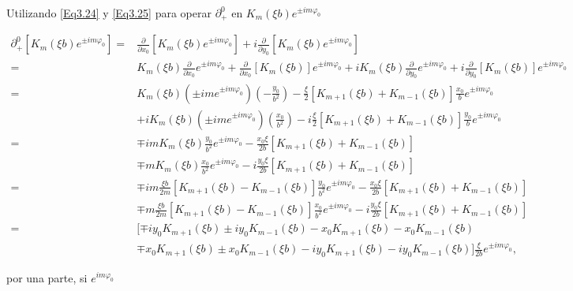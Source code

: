 \documentclass[a4paper,10pt]{article}
\newcommand{\parcial}[1]{\frac{\partial}{\partial {#1}}}	%
\begin{document}
Utilizando \eqref{Eq3.24} y \eqref{Eq3.25} para operar $\partial_+^0$ en $K_m(\xi b) e^{\pm im\varphi_0}$

\begin{subequations}
\begin{align}
\partial_+^0[K_m(\xi b) e^{\pm im\varphi_0}]
=&	\parcial{x_0}[K_m(\xi b)e^{\pm im\varphi_0}]+i\parcial{y_0}[K_m(\xi b)e^{\pm im\varphi_0}]	\\
=&	K_m(\xi b)\parcial{x_0}e^{\pm im\varphi_0}+\parcial{x_0}[K_m(\xi b)] e^{\pm im\varphi_0}+iK_m(\xi b)\parcial{y_0}e^{\pm im\varphi_0}+i\parcial{y_0}[K_m(\xi b)] e^{\pm im\varphi_0}	\\
=&	K_m(\xi b)(\pm im e^{\pm im\varphi_0})\left( -\frac{y_0}{b^2}\right)-\frac{\xi}{2}[K_{m+1}(\xi b)+K_{m-1}(\xi b)]\frac{x_0}{b}e^{\pm im\varphi_0}	\\
&+	iK_m(\xi b)(\pm im e^{\pm im\varphi_0})\left(\frac{x_0}{b^2}\right)-i\frac{\xi}{2}[K_{m+1}(\xi b)+K_{m-1}(\xi b)]\frac{y_0}{b}e^{\pm im\varphi_0}	\\
=&	\mp imK_m(\xi b)\frac{y_0}{b^2}e^{\pm im\varphi_0} -\frac{x_0\xi}{2b}[K_{m+1}(\xi b)+K_{m-1}(\xi b)]	\\
&	\mp mK_m(\xi b)\frac{x_0}{b^2}e^{\pm im\varphi_0} -i\frac{y_0\xi}{2b}[K_{m+1}(\xi b)+K_{m-1}(\xi b)]	\\
=&	\mp im\frac{\xi b}{2m}[K_{m+1}(\xi b)-K_{m-1}(\xi b)]\frac{y_0}{b^2}e^{\pm im\varphi_0} -\frac{x_0\xi}{2b}[K_{m+1}(\xi b)+K_{m-1}(\xi b)]	\\
&	\mp m\frac{\xi b}{2m}[K_{m+1}(\xi b)-K_{m-1}(\xi b)]\frac{x_0}{b^2}e^{\pm im\varphi_0} -i\frac{y_0\xi}{2b}[K_{m+1}(\xi b)+K_{m-1}(\xi b)]	\\
=&[\mp iy_0K_{m+1}(\xi b) \pm iy_0K_{m-1}(\xi b) -x_0K_{m+1}(\xi b)-x_0K_{m-1}(\xi b)	\\
&\mp x_0K_{m+1}(\xi b) \pm x_0K_{m-1}(\xi b) -iy_0K_{m+1}(\xi b)-iy_0K_{m-1}(\xi b)	]\frac{\xi}{2b}e^{\pm im\varphi_0},
\end{align}
\end{subequations}

por una parte, si $e^{im\varphi_0}$
\end{document}
